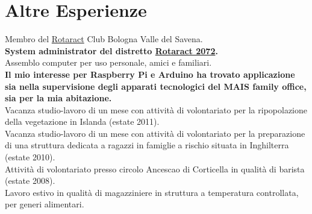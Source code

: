 \documentclass[%
               doublesided,
               paper=a4,
               fontsize=10pt
              ]{Rubini-Mattia-resume}
\begin{document}
    \section{Altre Esperienze}
        Membro del \href{https://en.wikipedia.org/wiki/Rotaract}{Rotaract} Club Bologna Valle del Savena.
        \\\textbf{System administrator del distretto \href{https://rotaract2072.com/}{Rotaract 2072}.}
        \\Assemblo computer per uso personale, amici e familiari.
        \\ \textbf{Il mio interesse per Raspberry Pi e Arduino ha trovato applicazione sia nella supervisione degli apparati tecnologici del MAIS family office, sia per la mia abitazione.}
        \\Vacanza studio-lavoro di un mese con attività di volontariato per la ripopolazione della vegetazione in Islanda (estate 2011).
        \\Vacanza studio-lavoro di un mese con attività di volontariato per la preparazione di una struttura dedicata a ragazzi in famiglie a rischio situata in Inghilterra (estate 2010).
        \\Attività di volontariato presso circolo Ancescao di Corticella in qualità di barista (estate 2008).
        \\Lavoro estivo in qualità di magazziniere in struttura a temperatura controllata, per generi alimentari.




\end{document}
